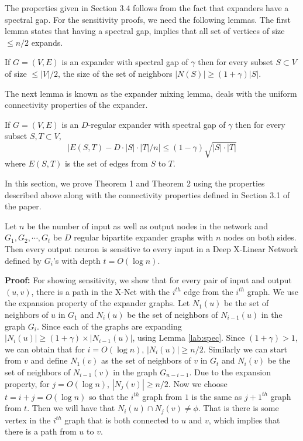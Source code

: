 \noindent The properties given in Section 3.4 follows from the fact that expanders have a spectral gap. For the sensitivity proofs, we need the following lemmas. The first lemma states that having a spectral gap, implies that all set of vertices of size $\leq n/2$ expands.
\begin{theorem} 
\label{lab:spec}
If $G=(V,E)$ is an expander with spectral gap of $\gamma$ then for every subset $S\subset V$ of size $\leq |V|/2$, the size of the set of neighbors $|N(S)| \geq (1+\gamma) |S|$.
\end{theorem}
The next lemma is known as the expander mixing lemma, deals with the uniform connectivity properties of the expander.
\begin{theorem}
\label{lab:exp-mix-lem}
If $G=(V,E)$ is an $D$-regular expander with spectral gap of $\gamma$ then for every subset $S,T\subset V$,
$$\left| E(S,T) - D \cdot |S| \cdot |T| / n  \right| \leq (1-\gamma)\sqrt{|S| \cdot |T|}$$
where $E(S,T)$ is the set of edges from $S$ to $T$.
\end{theorem}

\noindent In this section, we prove Theorem 1 and Theorem 2 using the properties described above along with the connectivity properties defined in Section 3.1 of the paper.
\begin{theorem}\label{thm:conn}
Let $n$ be the number of input as well as output nodes in the network and $G_1,G_2,\cdots, G_t$ be $D$ regular bipartite expander graphs with $n$ nodes on both sides. Then  
every output neuron is sensitive to every input in a Deep X-Linear Network defined by $G_i$'s with depth $t = O( \log n)$.
\end{theorem}
{\bf Proof:} For showing sensitivity, we show that for every pair of input and output $(u,v)$,  there is a path in the X-Net with the $i^{th}$ edge from the $i^{th}$ graph. 
We use the expansion property of the expander graphs. Let $N_1(u)$ be the set of neighbors of $u$ in $G_1$ and $N_i(u)$ be the set of neighbors of $N_{i-1}(u)$ in the graph $G_i$. Since each of the graphs are expanding $|N_{i}(u)| \geq (1+\gamma) \times |N_{i-1}(u)|$, using Lemma \ref{lab:spec}. Since $(1+\gamma) > 1$, we can obtain that for $i = O(\log n)$, $|N_i(u)| \geq n/2$. Similarly we can start from $v$ and define $N_1(v)$ as the set of neighbors of $v$ in $G_t$ and $N_i(v)$ be the set of neighbors of $N_{i-1}(v)$ in the graph $G_{n-i -1}$. Due to the expansion property, for $j = O(\log n)$, $|N_j(v)| \geq n/2$. Now we choose $t = i + j = O(\log n)$ so that the $i^{th}$ graph from $1$ is the same as $j+1^{th}$ graph from $t$. Then we will have that $N_i(u) \cap N_j(v) \neq \phi$. That is there is some vertex in the $i^{th}$ graph that is both connected to $u$ and $v$, which implies that there is a path from $u$ to $v$.

